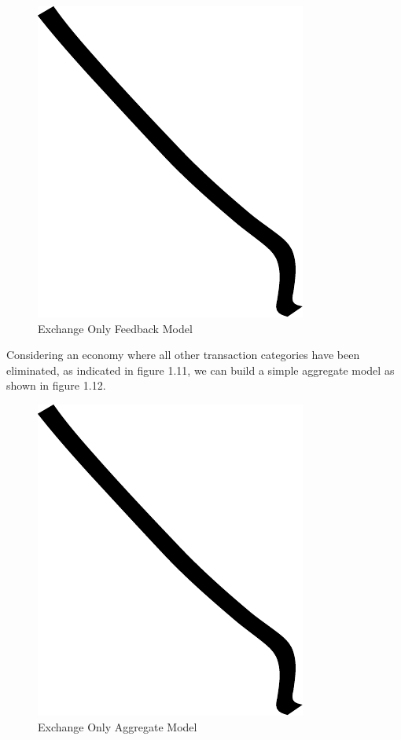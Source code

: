 \begin{figure}
\centering
\includegraphics{img/example.pdf}
\caption{Exchange Only Feedback Model}
\end{figure}

Considering an economy where all other transaction categories have been eliminated, as
indicated in figure 1.11, we can build a simple aggregate model as shown in figure 1.12.

\begin{figure}
\centering
\includegraphics{img/example.pdf}
\caption{Exchange Only Aggregate Model}
\end{figure}

